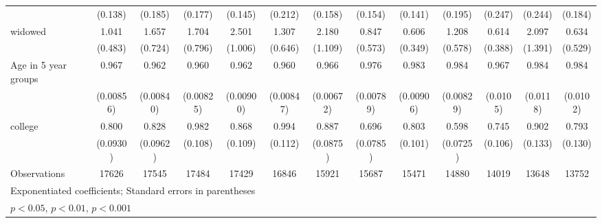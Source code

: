 {\begin{tabular}{l*{12}{c}}
                    &     (0.138)         &     (0.185)         &     (0.177)         &     (0.145)         &     (0.212)         &     (0.158)         &     (0.154)         &     (0.141)         &     (0.195)         &     (0.247)         &     (0.244)         &     (0.184)         \\
[1em]
widowed             &       1.041         &       1.657         &       1.704         &       2.501\sym{*}  &       1.307         &       2.180         &       0.847         &       0.606         &       1.208         &       0.614         &       2.097         &       0.634         \\
                    &     (0.483)         &     (0.724)         &     (0.796)         &     (1.006)         &     (0.646)         &     (1.109)         &     (0.573)         &     (0.349)         &     (0.578)         &     (0.388)         &     (1.391)         &     (0.529)         \\
[1em]
Age in 5 year groups&       0.967\sym{***}&       0.962\sym{***}&       0.960\sym{***}&       0.962\sym{***}&       0.960\sym{***}&       0.966\sym{***}&       0.976\sym{**} &       0.983         &       0.984         &       0.967\sym{**} &       0.984         &       0.984         \\
                    &   (0.00856)         &   (0.00840)         &   (0.00825)         &   (0.00900)         &   (0.00847)         &   (0.00672)         &   (0.00789)         &   (0.00906)         &   (0.00829)         &    (0.0105)         &    (0.0118)         &    (0.0102)         \\
[1em]
college             &       0.800         &       0.828         &       0.982         &       0.868         &       0.994         &       0.887         &       0.696\sym{**} &       0.803         &       0.598\sym{***}&       0.745\sym{*}  &       0.902         &       0.793         \\
                    &    (0.0930)         &    (0.0962)         &     (0.108)         &     (0.109)         &     (0.112)         &    (0.0875)         &    (0.0785)         &     (0.101)         &    (0.0725)         &     (0.106)         &     (0.133)         &     (0.130)         \\
\hline
Observations        &       17626         &       17545         &       17484         &       17429         &       16846         &       15921         &       15687         &       15471         &       14880         &       14019         &       13648         &       13752         \\
\hline\hline
\multicolumn{13}{l}{\footnotesize Exponentiated coefficients; Standard errors in parentheses}\\
\multicolumn{13}{l}{\footnotesize \sym{*} \(p<0.05\), \sym{**} \(p<0.01\), \sym{***} \(p<0.001\)}\\
\end{tabular}
}
